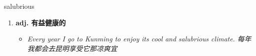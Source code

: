 
\begin{frame}
{\huge salubrious}
\begin{center}
\begin{enumerate}\Large
  \item \textbf{adj. 有益健康的}
  \begin{itemize}
    \item \em{\Large{Every year I go to Kunming to enjoy its cool and salubrious climate. 每年我都会去昆明享受它那凉爽宜}}
  \end{itemize}
\end{enumerate}
\end{center}
\end{frame}
